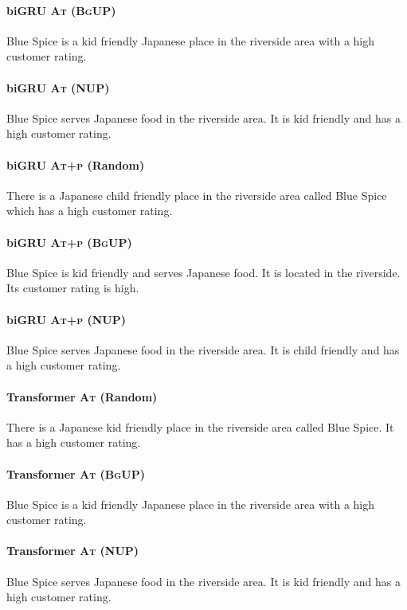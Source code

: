 \paragraph{biGRU \textsc{At (BgUP)}}
Blue Spice is a kid friendly Japanese place in the riverside area with a high customer rating.

\paragraph{biGRU \textsc{At} (NUP)}
Blue Spice serves Japanese food in the riverside area. It is kid friendly and has a high customer rating.



\paragraph{biGRU \textsc{At+p} (Random)}
There is a Japanese child friendly place in the riverside area called Blue Spice which has a high customer rating.

\paragraph{biGRU \textsc{At+p (BgUP)}}
Blue Spice is kid friendly and serves Japanese food. It is located in the riverside. Its customer rating is high.

\paragraph{biGRU \textsc{At+p} (NUP)}
Blue Spice serves Japanese food in the riverside area. It is child friendly and has a high customer rating.

\paragraph{Transformer \textsc{At} (Random)}
There is a Japanese kid friendly place in the riverside area called Blue Spice. It has a high customer rating.

\paragraph{Transformer \textsc{At (BgUP)}}
Blue Spice is a kid friendly Japanese place in the riverside area with a high customer rating.

\paragraph{Transformer \textsc{At} (NUP)}
Blue Spice serves Japanese food in the riverside area. It is kid friendly and has a high customer rating.

